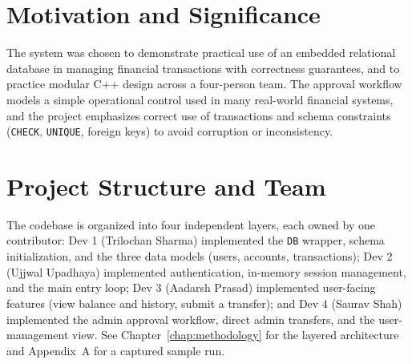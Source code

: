 \section{Motivation and Significance}
The system was chosen to demonstrate practical use of an embedded relational database in managing financial transactions with correctness guarantees, and to practice modular C++ design across a four-person team. The approval workflow models a simple operational control used in many real-world financial systems, and the project emphasizes correct use of transactions and schema constraints (\texttt{CHECK}, \texttt{UNIQUE}, foreign keys) to avoid corruption or inconsistency.

\section{Project Structure and Team}
The codebase is organized into four independent layers, each owned by one contributor: Dev 1 (Trilochan Sharma) implemented the \texttt{DB} wrapper, schema initialization, and the three data models (users, accounts, transactions); Dev 2 (Ujjwal Upadhaya) implemented authentication, in-memory session management, and the main entry loop; Dev 3 (Aadarsh Prasad) implemented user-facing features (view balance and history, submit a transfer); and Dev 4 (Saurav Shah) implemented the admin approval workflow, direct admin transfers, and the user-management view. See Chapter~\ref{chap:methodology} for the layered architecture and Appendix~A for a captured sample run.